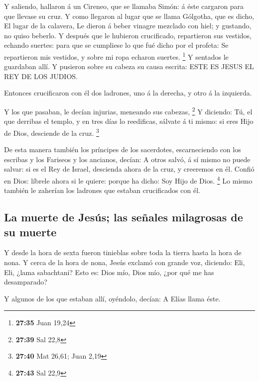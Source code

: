  Y saliendo, hallaron á un Cireneo, que se llamaba Simón:
á éste cargaron para que llevase su cruz.  Y como
llegaron al lugar que se llama Gólgotha, que es dicho, El lugar de la
calavera,  Le dieron á beber vinagre mezclado con hiel; y
gustando, no quiso beberlo.  Y después que le hubieron
crucificado, repartieron sus vestidos, echando suertes: para que se
cumpliese lo que fué dicho por el profeta: Se repartieron mis vestidos,
y sobre mi ropa echaron suertes. \footnote{\textbf{27:35} Juan 19,24}
 Y sentados le guardaban allí.  Y pusieron
sobre su cabeza su causa escrita: ESTE ES JESUS EL REY DE LOS JUDIOS.

 Entonces crucificaron con él dos ladrones, uno á la
derecha, y otro á la izquierda.

 Y los que pasaban, le decían injurias, meneando sus
cabezas, \footnote{\textbf{27:39} Sal 22,8}  Y diciendo:
Tú, el que derribas el templo, y en tres días lo reedificas, sálvate á
ti mismo: si eres Hijo de Dios, desciende de la cruz. \footnote{\textbf{27:40}
  Mat 26,61; Juan 2,19}

 De esta manera también los príncipes de los sacerdotes,
escarneciendo con los escribas y los Fariseos y los ancianos, decían:
 A otros salvó, á sí mismo no puede salvar: si es el Rey
de Israel, descienda ahora de la cruz, y creeremos en él.
 Confió en Dios: líbrele ahora si le quiere: porque ha
dicho: Soy Hijo de Dios. \footnote{\textbf{27:43} Sal 22,9}
 Lo mismo también le zaherían los ladrones que estaban
crucificados con él.

\hypertarget{la-muerte-de-jesuxfas-las-seuxf1ales-milagrosas-de-su-muerte}{%
\subsection{La muerte de Jesús; las señales milagrosas de su
muerte}\label{la-muerte-de-jesuxfas-las-seuxf1ales-milagrosas-de-su-muerte}}

 Y desde la hora de sexta fueron tinieblas sobre toda la
tierra hasta la hora de nona.  Y cerca de la hora de
nona, Jesús exclamó con grande voz, diciendo: Eli, Eli, ¿lama
sabachtani? Esto es: Dios mío, Dios mío, ¿por qué me has desamparado?

 Y algunos de los que estaban allí, oyéndolo, decían: A
Elías llama éste.

